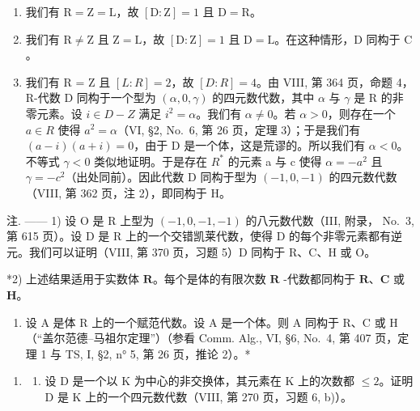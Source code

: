 \begin{enumerate}
\def\labelenumi{\alph{enumi})}
\item
  我们有 \(\mathrm{R} = \mathrm{Z} = \mathrm{L}\)，故 \([\mathrm{D}:\mathrm{Z}] = 1\) 且 \(\mathrm{D} = \mathrm{R}\)。
\item
  我们有 \(\mathrm{R} \neq \mathrm{Z}\) 且 \(\mathrm{Z} = \mathrm{L}\)，故 \([\mathrm{D} : \mathrm{Z}] = 1\) 且 \(\mathrm{D} = \mathrm{L}\)。在这种情形，\(\mathrm{D}\) 同构于 \(\mathrm{C}\)。
\item
  我们有 R = Z 且 \([L : R] = 2\)，故 \([D : R] = 4\)。由 VIII, 第 364 页，命题 4，R-代数 D 同构于一个型为 \((\alpha, 0, \gamma)\) 的四元数代数，其中 \(\alpha\) 与 \(\gamma\) 是 R 的非零元素。设 \(i \in D - Z\) 满足 \(i^{2} = \alpha\)。我们有 \(\alpha \neq 0\)。若 \(\alpha > 0\)，则存在一个 \(a \in R\) 使得 \(a^{2} = \alpha\)（VI, §2, No.~6, 第 26 页，定理 3）；于是我们有 \((a - i)(a + i) = 0\)，由于 D 是一个体，这是荒谬的。所以我们有 \(\alpha < 0\)。不等式 \(\gamma < 0\) 类似地证明。于是存在 \(R^{*}\) 的元素 a 与 c 使得 \(\alpha = -a^{2}\) 且 \(\gamma = -c^{2}\)（出处同前）。因此代数 D 同构于型为 \((-1,0,-1)\) 的四元数代数（VIII, 第 362 页，注 2），即同构于 H。
\end{enumerate}

注. —— 1) 设 O 是 R 上型为 \((-1,0,-1,-1)\) 的八元数代数（III, 附录， No.~3, 第 615 页）。设 D 是 R 上的一个交错凯莱代数，使得 D 的每个非零元素都有逆元。我们可以证明（VIII, 第 370 页，习题 5）D 同构于 R、C、H 或 O。

*2) 上述结果适用于实数体 \(\mathbf{R}\)。每个是体的有限次数 \(\mathbf{R}\) -代数都同构于 \(\mathbf{R}\)、\(\mathbf{C}\) 或 \(\mathbf{H}\)。

\begin{enumerate}
\def\labelenumi{\arabic{enumi})}
\setcounter{enumi}{2}
\tightlist
\item
  设 A 是体 R 上的一个赋范代数。设 A 是一个体。则 A 同构于 R、C 或 H（``盖尔范德--马祖尔定理''）（参看 Comm. Alg., VI, §6, No.~4, 第 407 页，定理 1 与 TS, I, §2, n° 5, 第 26 页，推论 2）。*
\end{enumerate}


\begin{enumerate}
\def\labelenumi{\arabic{enumi})}
\tightlist
\item
  \begin{enumerate}
  \def\labelenumii{\alph{enumii})}
  \tightlist
  \item
    设 D 是一个以 K 为中心的非交换体，其元素在 K 上的次数都 \(\leqslant 2\)。证明 D 是 K 上的一个四元数代数（VIII, 第 270 页，习题 6, b)）。
  \end{enumerate}
\end{enumerate}

